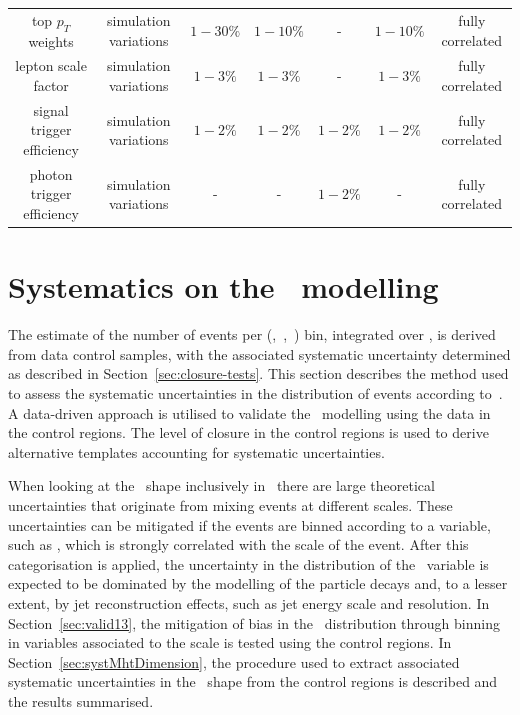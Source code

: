 \begin{landscape}
\begin{table}[h!]
\begin{tabular}{ ccccccc }
    top $p_{T}$ weights & simulation variations & $1-30\%$  & $1-10\%$ & - & $1-10\%$ & fully correlated \\
    lepton scale factor & simulation variations & $1-3\%$ & $1-3\%$ & - & $1-3\%$ & fully correlated \\
    signal trigger efficiency & simulation variations & $1-2\%$ & $1-2\%$ & $1-2\%$ & $1-2\%$ & fully correlated \\
    photon trigger efficiency & simulation variations & - & - & $1-2\%$ & - & fully correlated \\
    \hline
    \hline
  \end{tabular}
\end{table}
\end{landscape}


\section{Systematics on the \mht~modelling}
\label{sec:syst-on-shape}

The estimate of the number of events per (\njet,~\nb,~\scalht) bin,
integrated over \mht, is derived from data control samples, with
the associated systematic uncertainty determined as 
described in Section~\ref{sec:closure-tests}. This section
describes the method used to assess the systematic uncertainties in
the distribution of events according to~\mht. A data-driven approach is
utilised to validate the \mht~modelling using the data in the control regions.
The level of closure in the control regions is used
to derive alternative templates accounting for systematic uncertainties.

When looking at the \mht~shape inclusively in \scalht~there are
large theoretical uncertainties that originate from mixing events
at different scales. These uncertainties can be mitigated if the events 
are binned according to a variable, such as \scalht, 
which is strongly correlated with the scale of the event. 
After this categorisation is applied, the uncertainty in 
the distribution of the \mht~variable is expected to be 
dominated by the modelling of the particle 
decays and, to a lesser extent, by jet reconstruction effects, 
such as jet energy scale and resolution. In Section~\ref{sec:valid13},
the mitigation of bias in the \mht~distribution through binning in 
variables associated to the scale is tested using the control 
regions. In Section~\ref{sec:systMhtDimension}, the procedure used to 
extract associated systematic uncertainties in the \mht~shape from the 
control regions is described and the results summarised.

